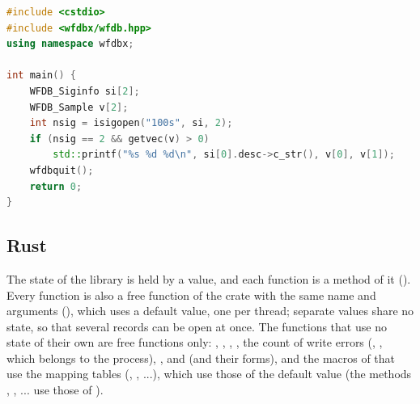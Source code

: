 \begin{lstlisting}[language=C++,style=example]
#include <cstdio>
#include <wfdbx/wfdb.hpp>
using namespace wfdbx;

int main() {
    WFDB_Siginfo si[2];
    WFDB_Sample v[2];
    int nsig = isigopen("100s", si, 2);
    if (nsig == 2 && getvec(v) > 0)
        std::printf("%s %d %d\n", si[0].desc->c_str(), v[0], v[1]);
    wfdbquit();
    return 0;
}
\end{lstlisting}

\subsection{Rust}
\label{sec:library-rust}

The state of the library is held by a  value, and each function is
a method of it (). Every function is also a free
function of the crate with the same name and arguments
(), which uses a default  value, one per
thread; separate  values share no state, so that several records
can be open at once. The functions that use no state of their own are free
functions only: , , ,
, the count of write errors (,
, which belongs to the process),
,  and  (and their  forms),
and the macros of  that use the mapping tables
(, , ...), which use those of the default value (the
methods , , ... use those of
).

